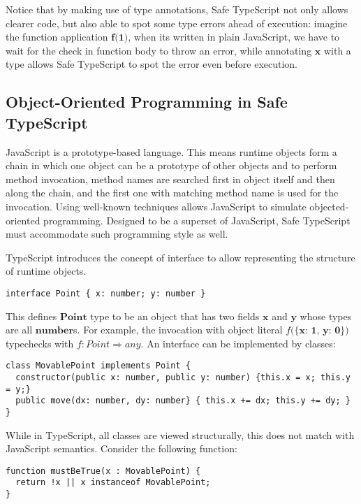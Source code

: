 Notice that by making use of type annotations, Safe TypeScript not only allows
clearer code, but also able to spot some type errors ahead of execution:
imagine the function application $\textbf{f(1)}$, when its written in plain JavaScript,
we have to wait for the check in function body to throw an error,
while annotating $\textbf{x}$ with a type allows Safe TypeScript
to spot the error even before execution.

\subsection{Object-Oriented Programming in Safe TypeScript}

JavaScript is a prototype-based language.
This means runtime objects form a chain in which one object
can be a prototype of other objects and
to perform method invocation, method names are searched
first in object itself and then along the chain,
and the first one with matching method name is used for the invocation.
Using well-known techniques allows JavaScript to simulate objected-oriented programming.
Designed to be a superset of JavaScript, Safe TypeScript must accommodate such programming
style as well.

TypeScript introduces the concept of interface to allow representing the structure
of runtime objects.

\begin{verbatim}
interface Point { x: number; y: number }
\end{verbatim}

This defines $\textbf{Point}$ type to be an object that has two fields $\textbf{x}$
and $\textbf{y}$ whose types are all $\textbf{number}$s.
For example, the invocation with object literal $f(\textbf{\{x: 1, y: 0\})}$ typechecks
with $f : Point \Rightarrow any$.
An interface can be implemented by classes:

\begin{verbatim}
class MovablePoint implements Point {
  constructor(public x: number, public y: number) {this.x = x; this.y = y;}
  public move(dx: number, dy: number} { this.x += dx; this.y += dy; }
}
\end{verbatim}

While in TypeScript, all classes are viewed structurally, this does not match
with JavaScript semantics. Consider the following function:

\begin{verbatim}
function mustBeTrue(x : MovablePoint) {
  return !x || x instanceof MovablePoint;
}
\end{verbatim}

